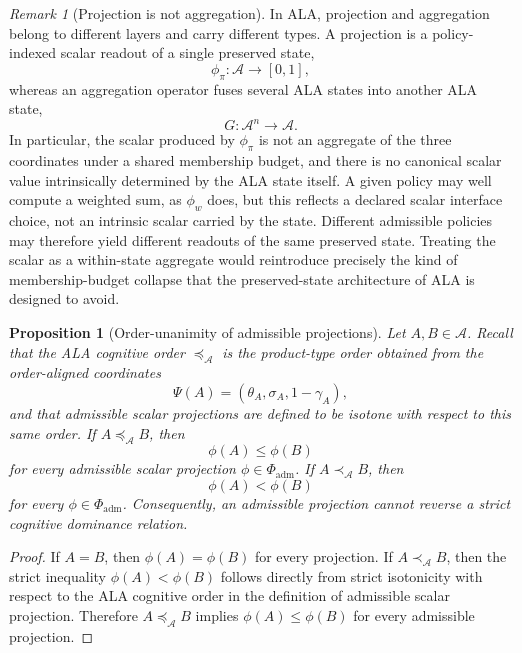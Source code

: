 \documentclass[reqno,final]{amsart}
\theoremstyle{definition}
\theoremstyle{plain}
\newtheorem{proposition}{Proposition}
\theoremstyle{remark}
\newtheorem{remark}{Remark}
\providecommand{\cA}{\mathcal{A}}
\providecommand{\cPhi}{\Phi}
\begin{document}
\begin{remark}[Projection is not aggregation]
\label{rem:projection-not-aggregation}
In ALA, projection and aggregation belong to different layers and carry
different types. A projection is a policy-indexed scalar readout of a single
preserved state,
\[
\phi_\pi:\cA\to[0,1],
\]
whereas an aggregation operator fuses several ALA states into another ALA
state,
\[
G:\cA^n\to\cA.
\]
In particular, the scalar produced by \(\phi_\pi\) is not an aggregate of
the three coordinates under a shared membership budget, and there is no
canonical scalar value intrinsically determined by the ALA state itself. A
given policy may well compute a weighted sum, as \(\phi_w\) does, but this
reflects a declared scalar interface choice, not an intrinsic scalar carried
by the state. Different admissible policies may therefore yield different
readouts of the same preserved state. Treating the scalar as a within-state
aggregate would reintroduce precisely the kind of membership-budget collapse
that the preserved-state architecture of ALA is designed to avoid.
\end{remark}

\begin{proposition}[Order-unanimity of admissible projections]
\label{prop:order-unanimity}
Let \(A,B\in\cA\). Recall that the ALA cognitive order \(\preceq_{\mathcal A}\) is the
product-type order obtained from the order-aligned coordinates
\[
\Psi(A)=(\theta_A,\sigma_A,1-\gamma_A),
\]
and that admissible scalar projections are defined to be isotone with
respect to this same order. If \(A\preceq_{\mathcal A} B\), then
\[
\phi(A)\leq \phi(B)
\]
for every admissible scalar projection \(\phi\in\cPhi_{\mathrm{adm}}\).
If \(A\prec_{\mathcal A} B\), then
\[
\phi(A)<\phi(B)
\]
for every \(\phi\in\cPhi_{\mathrm{adm}}\). Consequently, an admissible
projection cannot reverse a strict cognitive dominance relation.
\end{proposition}

\begin{proof}
If \(A=B\), then \(\phi(A)=\phi(B)\) for every projection. If
\(A\prec_{\mathcal A} B\), then the strict inequality \(\phi(A)<\phi(B)\) follows
directly from strict isotonicity with respect to the ALA cognitive order
in the definition of admissible scalar projection. Therefore
\(A\preceq_{\mathcal A} B\) implies \(\phi(A)\leq\phi(B)\) for every admissible
projection.
\end{proof}
\end{document}
